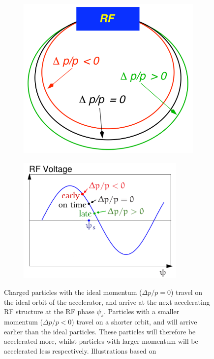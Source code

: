 \begin{figure}
\begin{subfigure}[b]{0.4\textwidth}
\centering
 \includegraphics[width=\textwidth]{Figures/PhaseFocusing.png}
\end{subfigure}\hfill
\begin{subfigure}[b]{0.49\textwidth}
\centering
 \includegraphics[width=0.9\textwidth]{Figures/RFphase.png}
\end{subfigure}
\caption[Phase focusing]{Charged particles with the ideal momentum ($\Delta p/p = 0$) travel on the ideal orbit of the accelerator, and arrive at the next accelerating RF structure at the RF phase $\psi_s$. 
Particles with a smaller momentum ($\Delta p/p < 0$) travel on a shorter orbit, and will arrive earlier than the ideal particles.
These particles will therefore be accelerated more, whilst particles with larger momentum will be accelerated less respectively.
Illustrations based on~\cite{Anke}}
\label{fig:RFPhase}
\end{figure}


